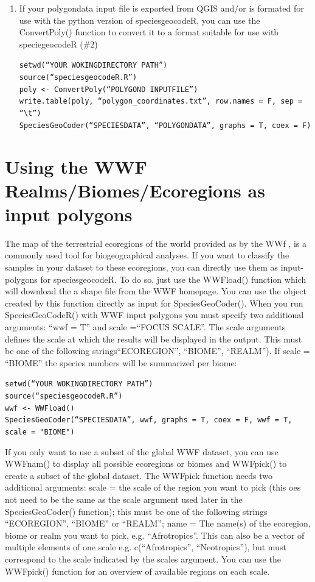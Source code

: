 \documentclass[a4paper,titlepage,11pt]{scrreprt}
\begin{document}
\begin{enumerate}
\item{If your polygondata input file is exported from QGIS and/or is formated for use with the python version of speciesgeocodeR, you can use the ConvertPoly() function to convert it to a format suitable for use with speciegeocodeR (\#2)}

\texttt{setwd(``YOUR WOKINGDIRECTORY PATH'')}\\
\texttt{source(``speciesgeocodeR.R'')}\\
\texttt{poly \textless- ConvertPoly(``POLYGOND INPUTFILE'')}\\
\texttt{write.table(poly, ``polygon\_coordinates.txt'', row.names = F,  sep = ``\textbackslash t'')}\\
\texttt{SpeciesGeoCoder(``SPECIESDATA'', ``POLYGONDATA'',  graphs = T, coex = F)}
\end{enumerate}

\chapter{Using the WWF Realms/Biomes/Ecoregions as input polygons} \label{wwf}

The map of the terrestrial ecoregions of the world provided as by the WWf \citet{WWF}, is a commonly used tool for biogeographical analyses. If you want to classify the samples in your dataset to these ecoregions, you can directly use them as input-polygons for speciesgeocodeR. To do so, just use the WWFload() function which will download the a shape file from the WWF homepage.  You can use the object created by this function directly as input for SpeciesGeoCoder(). When you run SpeciesGeoCodeR() with WWF input polygons you must specify two additional arguments: ``wwf = T'' and scale =``FOCUS SCALE''. The scale arguments defines the scale at which the results will be displayed in the output. This must be one of the following strings``ECOREGION'', ``BIOME'', ``REALM''). If scale = ``BIOME'' the species numbers will be summarized per biome: 

\texttt{setwd(``YOUR WOKINGDIRECTORY PATH'')}\\
\texttt{source(``speciesgeocodeR.R'')}\\
\texttt{wwf \textless- WWFload()}\\
\texttt{SpeciesGeoCoder(``SPECIESDATA'', wwf,  graphs = T, coex = F, wwf = T, scale = "BIOME")}

If you only want to use a subset of the global WWF dataset, you can use WWFnam() to display all possible ecoregions or biomes and WWFpick()  to create a subset of the global dataset. The WWFpick function needs two additional arguments: scale  = the scale of the region you want to pick (this oes not need to be the same as the scale argument used later in the SpeciesGeoCoder() function); this must be one of the following strings ``ECOREGION'', ``BIOME'' or ``REALM'';  name = The name(s) of the ecoregion, biome or realm you want to pick, e.g. ``Afrotropics''. This can also be a vector of multiple elements of one scale e.g. c(``Afrotropics'', ``Neotropics''), but must correspond to the scale indicated by the scales argument. You can use the WWFpick() function for an overview of available regions on each scale.
\end{document}
